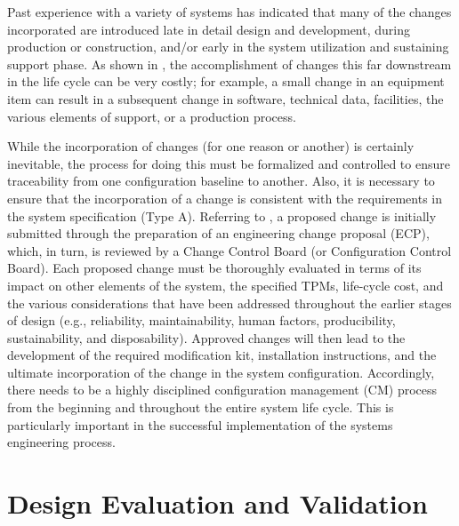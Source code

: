 Past experience with a variety of systems has indicated that many of the changes incorporated are introduced late in detail design and development, during production or construction, and/or early in the system utilization and sustaining support phase. As shown in , the accomplishment of changes this far downstream in the life cycle can be very costly; for example, a small change in an equipment item can result in a subsequent change in software, technical data, facilities, the various elements of support, or a production process.

While the incorporation of changes (for one reason or another) is certainly inevitable, the process for doing this must be formalized and controlled to ensure traceability from one configuration baseline to another. Also, it is necessary to ensure that the incorporation of a change is consistent with the requirements in the system specification (Type A). Referring to , a proposed change is initially submitted through the preparation of an engineering change proposal (ECP), which, in turn, is reviewed by a Change Control Board (or Configuration Control Board). Each proposed change must be thoroughly evaluated in terms of its impact on other elements of the system, the specified TPMs, life-cycle cost, and the various considerations that have been addressed throughout the earlier stages of design (e.g., reliability, maintainability, human factors, producibility, sustainability, and disposability). Approved changes will then lead to the development of the required modification kit, installation instructions, and the ultimate incorporation of the change in the system configuration. Accordingly, there needs to be a highly disciplined configuration management (CM) process from the beginning and throughout the entire system life cycle. This is particularly important in the successful implementation of the systems engineering process.


\section{Design Evaluation and Validation}

